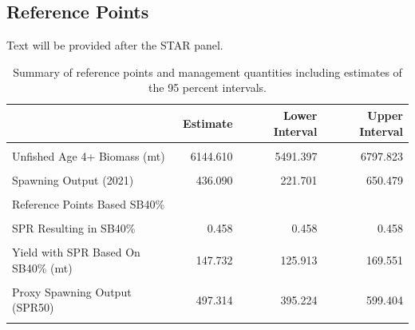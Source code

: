 \documentclass[
  english,
  a4paper,
]{article}
\begin{document}
\hypertarget{reference-points}{%
\subsection*{Reference Points}\label{reference-points}}

Text will be provided after the STAR panel.

\begin{table}[H]

\caption{\label{tab:referenceES}Summary of reference points and management quantities including estimates of the 95 percent intervals.}
\centering
\begin{tabular}[t]{lrrr}
\toprule
 & Estimate & Lower Interval & Upper Interval\\
\midrule
\cellcolor{gray!6}{Unfished Spawning Output} & \cellcolor{gray!6}{1114.670} & \cellcolor{gray!6}{885.848} & \cellcolor{gray!6}{1343.492}\\
Unfished Age 4+ Biomass (mt) & 6144.610 & 5491.397 & 6797.823\\
\cellcolor{gray!6}{Unfished Recruitment (R0)} & \cellcolor{gray!6}{433.531} & \cellcolor{gray!6}{306.058} & \cellcolor{gray!6}{561.004}\\
Spawning Output (2021) & 436.090 & 221.701 & 650.479\\
\cellcolor{gray!6}{Fraction Unfished (2021)} & \cellcolor{gray!6}{0.391} & \cellcolor{gray!6}{0.210} & \cellcolor{gray!6}{0.572}\\
\addlinespace
Reference Points Based SB40\% &  &  & \\
\cellcolor{gray!6}{Proxy Spawning Output SB40\%} & \cellcolor{gray!6}{445.868} & \cellcolor{gray!6}{354.339} & \cellcolor{gray!6}{537.397}\\
SPR Resulting in SB40\% & 0.458 & 0.458 & 0.458\\
\cellcolor{gray!6}{Exploitation Rate Resulting in SB40\%} & \cellcolor{gray!6}{0.074} & \cellcolor{gray!6}{0.061} & \cellcolor{gray!6}{0.087}\\
Yield with SPR Based On SB40\% (mt) & 147.732 & 125.913 & 169.551\\
\addlinespace
\cellcolor{gray!6}{Reference Points Based on SPR Proxy for MSY} & \cellcolor{gray!6}{} & \cellcolor{gray!6}{} & \cellcolor{gray!6}{}\\
Proxy Spawning Output (SPR50) & 497.314 & 395.224 & 599.404\\
\cellcolor{gray!6}{SPR50} & \cellcolor{gray!6}{0.500} & \cellcolor{gray!6}{} & \cellcolor{gray!6}{}\\

\end{tabular}
\end{table}
\end{document}
